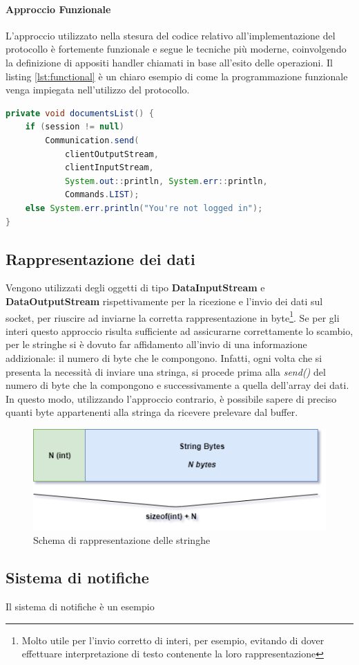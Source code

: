 \paragraph{Approccio Funzionale}
L'approccio utilizzato nella stesura del codice relativo all'implementazione del protocollo è fortemente funzionale e segue le tecniche più moderne, coinvolgendo la definizione di appositi handler chiamati in base all'esito delle operazioni. Il listing \ref{lst:functional} è un chiaro esempio di come la programmazione funzionale venga impiegata nell'utilizzo del protocollo.

\begin{lstlisting}[language=java, caption="Frammento in cui si evidenzia l'approccio funzionale del protocollo", label={lst:functional}, float]
private void documentsList() {
	if (session != null)
		Communication.send(
			clientOutputStream,
			clientInputStream,
			System.out::println, System.err::println,
			Commands.LIST);
	else System.err.println("You're not logged in");
}
\end{lstlisting}

\subsection{Rappresentazione dei dati}\label{rappresentazione_dei_dati}
Vengono utilizzati degli oggetti di tipo \textbf{DataInputStream} e \textbf{DataOutputStream} rispettivamente per la ricezione e l'invio dei dati sul socket, per riuscire ad inviarne la corretta rappresentazione in byte\footnote{Molto utile per l'invio corretto di interi, per esempio, evitando di dover effettuare interpretazione di testo contenente la loro rappresentazione}. Se per gli interi questo approccio risulta sufficiente ad assicurarne correttamente lo scambio, per le stringhe si è dovuto far affidamento all'invio di una informazione addizionale: il numero di byte che le compongono. Infatti, ogni volta che si presenta la necessità di inviare una stringa, si procede prima alla \textit{send()} del numero di byte che la compongono e successivamente a quella dell'array dei dati. In questo modo, utilizzando l'approccio contrario, è possibile sapere di preciso quanti byte appartenenti alla stringa da ricevere prelevare dal buffer.

\begin{figure}[h]
	\caption{Schema di rappresentazione delle stringhe}
	\centering
	\includegraphics[scale=0.6]{assets/string_representation.png}
\end{figure}

\subsection{Sistema di notifiche}
Il sistema di notifiche è un esempio 